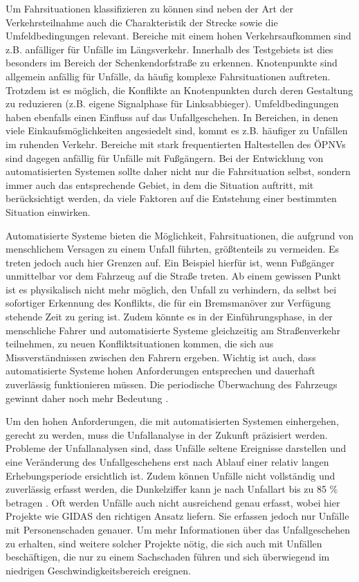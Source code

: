 Um Fahrsituationen klassifizieren zu können sind neben der Art der Verkehrsteilnahme auch die Charakteristik der Strecke sowie die Umfeldbedingungen relevant. Bereiche mit einem hohen Verkehrsaufkommen sind z.B. anfälliger für Unfälle im Längsverkehr. Innerhalb des Testgebiets ist dies besonders im Bereich der Schenkendorfstraße zu erkennen. Knotenpunkte sind allgemein anfällig für Unfälle, da häufig komplexe Fahrsituationen auftreten. Trotzdem ist es möglich, die Konflikte an Knotenpunkten durch deren Gestaltung zu reduzieren (z.B. eigene Signalphase für Linksabbieger). Umfeldbedingungen haben ebenfalls einen Einfluss auf das Unfallgeschehen. In Bereichen, in denen viele Einkaufsmöglichkeiten angesiedelt sind, kommt es z.B. häufiger zu Unfällen im ruhenden Verkehr. Bereiche mit stark frequentierten Haltestellen des ÖPNVs sind dagegen anfällig für Unfälle mit Fußgängern. Bei der Entwicklung von automatisierten Systemen sollte daher nicht nur die Fahrsituation selbst, sondern immer auch das entsprechende Gebiet, in dem die Situation auftritt, mit berücksichtigt werden, da viele Faktoren auf die Entstehung einer bestimmten Situation einwirken.

Automatisierte Systeme bieten die Möglichkeit, Fahrsituationen, die aufgrund von menschlichem Versagen zu einem Unfall führten, größtenteils zu vermeiden. Es treten jedoch auch hier Grenzen auf. Ein Beispiel hierfür ist, wenn Fußgänger unmittelbar vor dem Fahrzeug auf die Straße treten. Ab einem gewissen Punkt ist es physikalisch nicht mehr möglich, den Unfall zu verhindern, da selbst bei sofortiger Erkennung des Konflikts, die für ein Bremsmanöver zur Verfügung stehende Zeit zu gering ist. Zudem könnte es in der Einführungsphase, in der menschliche Fahrer und automatisierte Systeme gleichzeitig am Straßenverkehr teilnehmen, zu neuen Konfliktsituationen kommen, die sich aus Missverständnissen zwischen den Fahrern ergeben. Wichtig ist auch, dass automatisierte Systeme hohen Anforderungen entsprechen und dauerhaft zuverlässig funktionieren müssen. Die periodische Überwachung des Fahrzeugs gewinnt daher noch mehr Bedeutung \parencite[S. 62]{DEKRA.2017}.

Um den hohen Anforderungen, die mit automatisierten Systemen einhergehen, gerecht zu werden, muss die Unfallanalyse in der Zukunft präzisiert werden. Probleme der Unfallanalysen sind, dass Unfälle seltene Ereignisse darstellen und eine Veränderung des Unfallgeschehens erst nach Ablauf einer relativ langen Erhebungsperiode ersichtlich ist. Zudem können Unfälle nicht vollständig und zuverlässig erfasst werden, die Dunkelziffer kann je nach Unfallart bis zu 85 \% betragen \parencite[S. 
7-9]{Erke.1978}. Oft werden Unfälle auch nicht ausreichend genau erfasst, wobei hier Projekte wie GIDAS den richtigen Ansatz liefern. Sie erfassen jedoch nur Unfälle mit Personenschaden genauer. Um mehr Informationen über das Unfallgeschehen zu erhalten, sind weitere solcher Projekte nötig, die sich auch mit Unfällen beschäftigen, die nur zu einem Sachschaden führen und sich überwiegend im niedrigen Geschwindigkeitsbereich ereignen.

